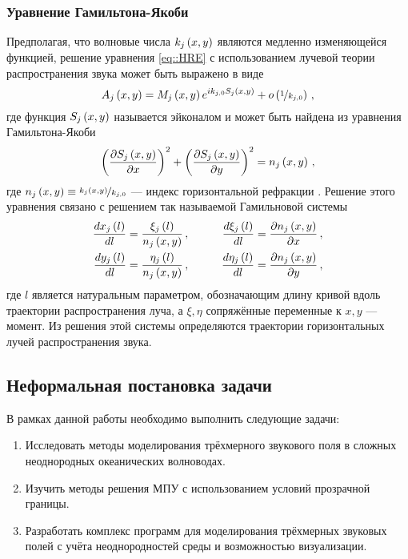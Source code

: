 \documentclass[../document.tex]{subfiles}
\begin{document}
        \subsubsection{Уравнение Гамильтона-Якоби}
            \par Предполагая, что волновые числа $k_j\left(x,y\right)$ являются медленно изменяющейся функцией, решение уравнения \eqref{eq::HRE} с использованием лучевой теории распространения звука может быть выражено в виде
            \begin{equation}
                A_j\left(x,y\right)=M_j\left(x,y\right)e^{ik_{j,0}S_j\left(x,y\right)}+o\left(\nicefrac{1}{k_{j,0}}\right)\,,
            \end{equation}
            где функция $S_j\left(x,y\right)$ называется эйконалом и может быть найдена из уравнения Гамильтона-Якоби
            \begin{equation}
                \left(\frac{\partial S_j\left(x,y\right)}{\partial x}\right)^2+\left(\frac{\partial S_j\left(x,y\right)}{\partial y}\right)^2=n_j\left(x,y\right)\,,
            \end{equation}
            где $n_j\left(x,y\right)\equiv \nicefrac{k_j\left(x,y\right)}{k_{j,0}}$ --- индекс горизонтальной рефракции \cite{burridge}. Решение этого уравнения связано с решением так называемой Гамильновой системы
            \begin{equation}
                \begin{aligned}
                    \frac{dx_j\left(l\right)}{dl}&=\frac{\xi_j\left(l\right)}{n_j\left(x,y\right)}\,,\qquad&\frac{d\xi_j\left(l\right)}{dl}&=\frac{\partial n_j\left(x,y\right)}{\partial x}\,,\\
                    \frac{dy_j\left(l\right)}{dl}&=\frac{\eta_j\left(l\right)}{n_j\left(x,y\right)}\,,\qquad&\frac{d\eta_j\left(l\right)}{dl}&=\frac{\partial n_j\left(x,y\right)}{\partial y}\,,\\
                \end{aligned}
            \end{equation}
            где $l$ является натуральным параметром, обозначающим длину кривой вдоль траектории распространения луча, а $\xi,\eta$ сопряжённые переменные к $x,y$ --- момент. Из решения этой системы определяются траектории горизонтальных лучей распространения звука.
    \subsection{Неформальная постановка задачи}
        \par В рамках данной работы необходимо выполнить следующие задачи:
        \begin{enumerate}
            \item Исследовать методы моделирования трёхмерного звукового поля в сложных неоднородных океанических волноводах.
            \item Изучить методы решения МПУ с использованием условий прозрачной границы.
            \item Разработать комплекс программ для моделирования трёхмерных звуковых полей с учёта неоднородностей среды и возможностью визуализации.
        \end{enumerate}
\end{document}
